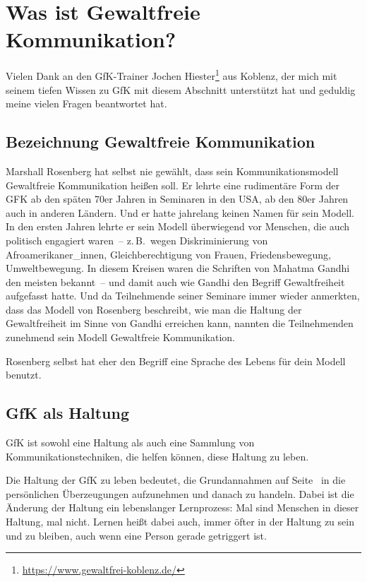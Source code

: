 \section{Was ist Gewaltfreie Kommunikation?}

Vielen Dank an den GfK-Trainer Jochen Hiester\footnote{\url{https://www.gewaltfrei-koblenz.de/}} aus Koblenz, der mich mit seinem tiefen Wissen zu GfK mit diesem Abschnitt unterstützt hat und geduldig meine vielen Fragen beantwortet hat.


\subsection{Bezeichnung \glqq Gewaltfreie Kommunikation\grqq}

Marshall Rosenberg hat selbst nie gewählt, dass sein Kommunikationsmodell Gewaltfreie Kommunikation heißen soll. Er lehrte eine rudimentäre Form der GFK ab den späten 70er Jahren in Seminaren in den USA, ab den 80er Jahren auch in anderen Ländern. Und er hatte jahrelang keinen Namen für sein Modell. In den ersten Jahren lehrte er sein Modell überwiegend vor Menschen, die auch politisch engagiert waren~-- z.\,B.~wegen Diskriminierung von Afroamerikaner\_innen, Gleichberechtigung von Frauen, Friedensbewegung, Umweltbewegung. In diesem Kreisen waren die Schriften von Mahatma Gandhi den meisten bekannt~-- und damit auch wie Gandhi den Begriff \glqq Gewaltfreiheit\grqq{} aufgefasst hatte. Und da Teilnehmende seiner Seminare immer wieder anmerkten, dass das Modell von Rosenberg beschreibt, wie man die Haltung der Gewaltfreiheit im Sinne von Gandhi erreichen kann, nannten die Teilnehmenden zunehmend sein Modell Gewaltfreie Kommunikation.

Rosenberg selbst hat eher den Begriff \glqq eine Sprache des Lebens\grqq{} für dein Modell benutzt.


\subsection{GfK als Haltung}
\label{gfk-haltung}

GfK ist sowohl eine Haltung als auch eine Sammlung von Kommunikationstechniken, die helfen können, diese Haltung zu leben.

Die Haltung der GfK zu leben bedeutet, die Grundannahmen auf Seite~\pageref{gfk-haltung} in die persönlichen Überzeugungen aufzunehmen und danach zu handeln. Dabei ist die Änderung der Haltung ein lebenslanger Lernprozess: Mal sind Menschen in dieser Haltung, mal nicht. Lernen heißt dabei auch, immer öfter in der Haltung zu sein und zu bleiben, auch wenn eine Person gerade getriggert ist.


